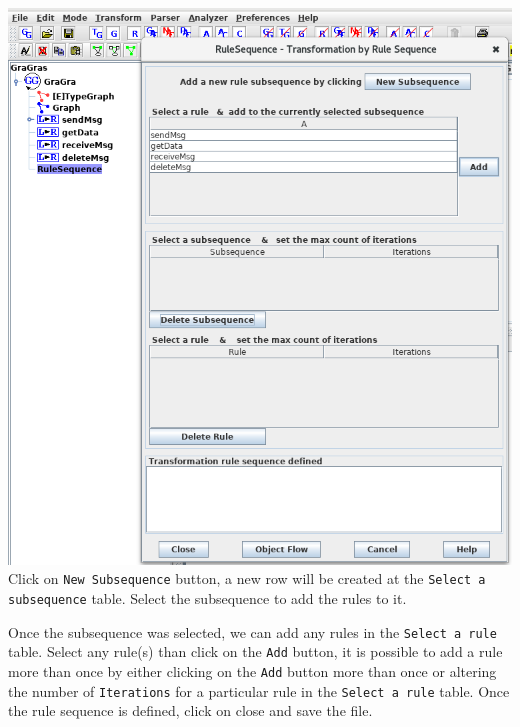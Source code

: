 \documentclass[12pt]{article}
\begin{document}
\noindent
\includegraphics[scale = 0.5]{rule-sequence_02.png}\\

Click on \texttt{New Subsequence} button, a new row will be created at the \texttt{Select a subsequence} table. Select the subsequence to add the rules to it.

Once the subsequence was selected, we can add any rules in the \texttt{Select a rule} table. Select any rule(s) than click on the \texttt{Add} button, it is possible to add a rule more than once by either clicking on the \texttt{Add} button more than once or altering the number of \texttt{Iterations} for a particular rule in the \texttt{Select a rule} table. Once the rule sequence is defined, click on close and save the file.\\
\end{document}

